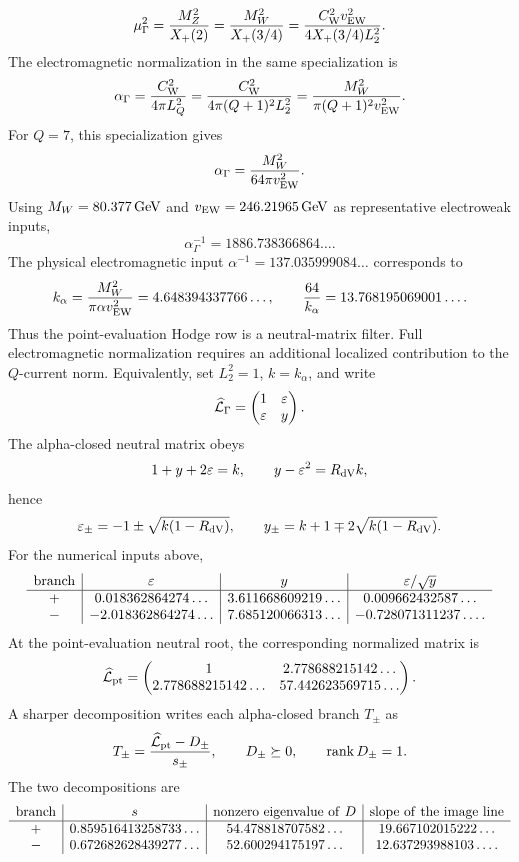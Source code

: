 \documentclass[11pt]{article}
\theoremstyle{definition}
\theoremstyle{remark}
\newcommand{\Xp}{X_+}
\begin{document}
\[
  \mu_\Gamma^2
  =
  \frac{M_Z^2}{\Xp(2)}
  =
  \frac{M_W^2}{\Xp(3/4)}
  =
  \frac{C_{\rm W}^2v_{\rm EW}^2}{4\Xp(3/4)L_2^2}.
\]
The electromagnetic normalization in the same specialization is
\[
  \alpha_\Gamma
  =
  \frac{C_{\rm W}^2}{4\pi L_Q^2}
  =
  \frac{C_{\rm W}^2}{4\pi(Q+1)^2L_2^2}
  =
  \frac{M_W^2}{\pi(Q+1)^2v_{\rm EW}^2}.
\]
For \(Q=7\), this specialization gives
\[
  \alpha_\Gamma=\frac{M_W^2}{64\pi v_{\rm EW}^2}.
\]
Using \(M_W=80.377\,{\rm GeV}\) and
\(v_{\rm EW}=246.21965\,{\rm GeV}\) as representative electroweak inputs,
\[
  \alpha_\Gamma^{-1}=1886.738366864\ldots .
\]
The physical electromagnetic input \(\alpha^{-1}=137.035999084\ldots\)
corresponds to
\[
  k_\alpha=
  \frac{M_W^2}{\pi\alpha v_{\rm EW}^2}
  =
  4.648394337766\ldots,
  \qquad
  \frac{64}{k_\alpha}=13.768195069001\ldots .
\]
Thus the point-evaluation Hodge row is a neutral-matrix filter.  Full
electromagnetic normalization requires an additional localized contribution
to the \(Q\)-current norm.
Equivalently, set \(L_2^2=1\), \(k=k_\alpha\), and write
\[
  \widehat{\cal L}_\Gamma=
  \begin{pmatrix}
    1&\varepsilon\\
    \varepsilon&y
  \end{pmatrix}.
\]
The alpha-closed neutral matrix obeys
\[
  1+y+2\varepsilon=k,
  \qquad
  y-\varepsilon^2=R_{\rm dV}k,
\]
hence
\[
  \varepsilon_\pm=-1\pm\sqrt{k(1-R_{\rm dV})},
  \qquad
  y_\pm=k+1\mp2\sqrt{k(1-R_{\rm dV})}.
\]
For the numerical inputs above,
\[
\begin{array}{c|c|c|c}
{\rm branch}&\varepsilon&y&\varepsilon/\sqrt y\\ \hline
+&0.018362864274\ldots&3.611668609219\ldots&0.009662432587\ldots\\
-&-2.018362864274\ldots&7.685120066313\ldots&-0.728071311237\ldots .
\end{array}
\]
At the point-evaluation neutral root, the corresponding normalized matrix is
\[
  \widehat{\cal L}_{\rm pt}
  =
  \begin{pmatrix}
  1&2.778688215142\ldots\\
  2.778688215142\ldots&57.442623569715\ldots
  \end{pmatrix}.
\]
A sharper decomposition writes each alpha-closed branch \(T_\pm\) as
\[
  T_\pm=\frac{\widehat{\cal L}_{\rm pt}-D_\pm}{s_\pm},
  \qquad
  D_\pm\succeq0,\qquad {\rm rank}\,D_\pm=1 .
\]
The two decompositions are
\[
\begin{array}{c|c|c|c}
{\rm branch}&s&{\rm nonzero\ eigenvalue\ of\ }D&
{\rm slope\ of\ the\ image\ line}\\ \hline
+&0.859516413258733\ldots&
54.478818707582\ldots&
19.667102015222\ldots\\
-&0.672682628439277\ldots&
52.600294175197\ldots&
12.637293988103\ldots .
\end{array}
\]
\end{document}
